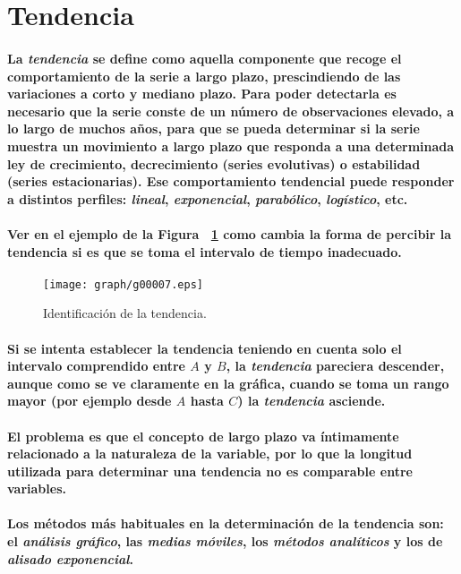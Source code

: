 \section{Tendencia}
\paragraph{
La \emph{tendencia} se define como aquella componente que recoge el comportamiento de la serie a largo plazo, prescindiendo de las variaciones a corto y mediano plazo. Para poder detectarla es necesario que la serie conste de un número de observaciones elevado, a lo largo de muchos años, para que se pueda determinar si la serie muestra un movimiento a largo plazo que responda a una determinada ley de crecimiento, decrecimiento (series evolutivas) o estabilidad (series estacionarias). Ese comportamiento tendencial puede responder a distintos perfiles: \emph{lineal}, \emph{exponencial}, \emph{parabólico}, \emph{logístico}, etc.
}
\paragraph{
Ver en el ejemplo de la Figura ~\ref{fig:IdentificacionDeLaTendencia} como cambia la forma de percibir la tendencia si es que se toma el intervalo de tiempo inadecuado.
}
\begin{figure}[ht]
\centering
\texttt{[image: graph/g00007.eps]}
\caption[Tendencia]{Identificación de la tendencia.}
\label{fig:IdentificacionDeLaTendencia}
\end{figure}
\paragraph{
Si se intenta establecer la tendencia teniendo en cuenta solo el intervalo comprendido entre $A$ y $B$, la \emph{tendencia} pareciera descender, aunque como se ve claramente en la gráfica, cuando se toma un rango mayor (por ejemplo desde $A$ hasta $C$) la \emph{tendencia} asciende.
}
\paragraph{
El problema es que el concepto de largo plazo va íntimamente relacionado a la naturaleza de la variable, por lo que la longitud utilizada para determinar una tendencia no es comparable entre variables.
}
\paragraph{
Los métodos más habituales en la determinación de la tendencia son: el \emph{análisis gráfico}, las \emph{medias móviles}, los \emph{métodos analíticos} y los de \emph{alisado exponencial}.
}


